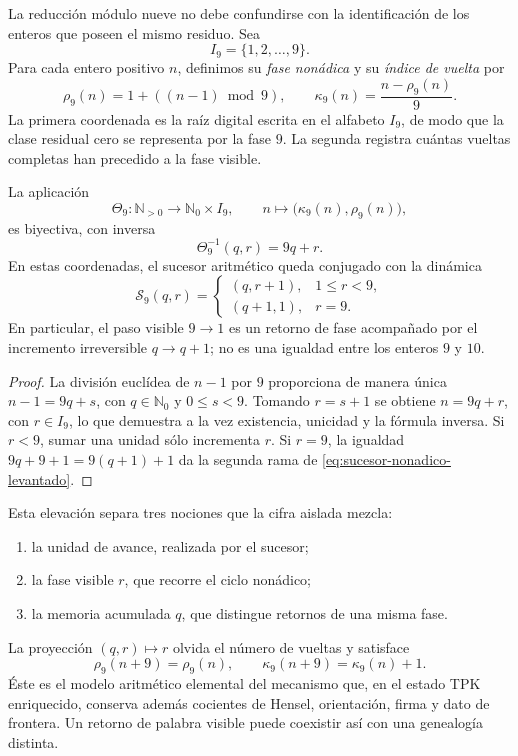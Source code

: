 La reducción módulo nueve no debe confundirse con la identificación de los
enteros que poseen el mismo residuo. Sea
\[
 I_9=\{1,2,\ldots,9\}.
\]
Para cada entero positivo \(n\), definimos su \emph{fase nonádica} y su
\emph{índice de vuelta} por
\begin{equation}
 \rho_9(n)=1+((n-1)\bmod9),
 \qquad
 \kappa_9(n)=\frac{n-\rho_9(n)}9.
 \label{eq:coordenada-nonadica-levantada}
\end{equation}
La primera coordenada es la raíz digital escrita en el alfabeto
\(I_9\), de modo que la clase residual cero se representa por la fase \(9\).
La segunda registra cuántas vueltas completas han precedido a la fase
visible.

\begin{theorem}
\label{thm:descomposicion-nonadica-memoria}
La aplicación
\[
 \Theta_9:\mathbb N_{>0}\longrightarrow\mathbb N_0\times I_9,
 \qquad
 n\longmapsto\bigl(\kappa_9(n),\rho_9(n)\bigr),
\]
es biyectiva, con inversa
\[
 \Theta_9^{-1}(q,r)=9q+r.
\]
En estas coordenadas, el sucesor aritmético queda conjugado con la dinámica
\begin{equation}
 \mathcal S_9(q,r)=
 \begin{cases}
  (q,r+1),&1\leq r<9,\\
  (q+1,1),&r=9.
 \end{cases}
 \label{eq:sucesor-nonadico-levantado}
\end{equation}
En particular, el paso visible \(9\to1\) es un retorno de fase acompañado
por el incremento irreversible \(q\to q+1\); no es una igualdad entre los
enteros \(9\) y \(10\).
\end{theorem}

\begin{proof}
La división euclídea de \(n-1\) por \(9\) proporciona de manera única
\(n-1=9q+s\), con \(q\in\mathbb N_0\) y \(0\leq s<9\). Tomando
\(r=s+1\) se obtiene \(n=9q+r\), con \(r\in I_9\), lo que demuestra a la vez
existencia, unicidad y la fórmula inversa. Si \(r<9\), sumar una unidad sólo
incrementa \(r\). Si \(r=9\), la igualdad
\(9q+9+1=9(q+1)+1\) da la segunda rama de
\cref{eq:sucesor-nonadico-levantado}.
\end{proof}

Esta elevación separa tres nociones que la cifra aislada mezcla:
\begin{enumerate}
\item la unidad de avance, realizada por el sucesor;
\item la fase visible \(r\), que recorre el ciclo nonádico;
\item la memoria acumulada \(q\), que distingue retornos de una misma fase.
\end{enumerate}
La proyección \((q,r)\mapsto r\) olvida el número de vueltas y satisface
\[
 \rho_9(n+9)=\rho_9(n),
 \qquad
 \kappa_9(n+9)=\kappa_9(n)+1.
\]
Éste es el modelo aritmético elemental del mecanismo que, en el estado TPK
enriquecido, conserva además cocientes de Hensel, orientación, firma y dato
de frontera. Un retorno de palabra visible puede coexistir así con una
genealogía distinta.

